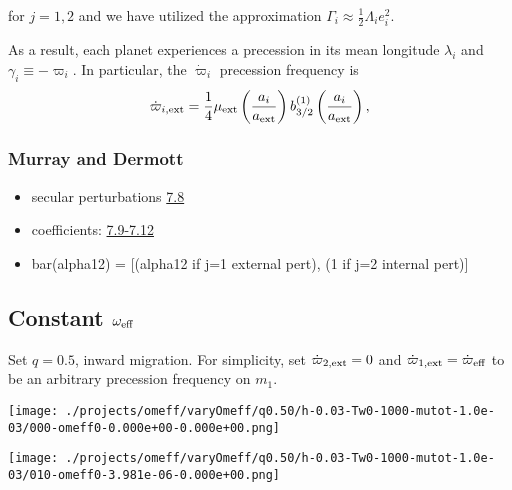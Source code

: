 \documentclass[11pt]{article}
\begin{document}
\noindent
for \(j=1,2\) and we have utilized the approximation \(\Gamma_i \approx \frac12 \Lambda_i e_i^2\).

As a result, each planet experiences a precession in its mean longitude \(\lambda_i\) and
\(\gamma_i\equiv -\varpi_i\). In particular, the \(\dot\varpi_i\) precession frequency
is
\begin{equation}
\dot\varpi_{i, \rm ext} = \frac14 \mu_{\rm ext} 
    \left(\frac{a_i}{a_{\rm ext}}\right) b_{3/2}^{(1)}\left(\frac{a_i}{a_{\rm ext}}\right),
\end{equation}

\subsubsection{Murray and Dermott}
\label{sec:org026bc7a}
\begin{itemize}
\item secular perturbations \href{./images/screenshot-02.png}{7.8}
\item coefficients: \href{./images/screenshot-03.png}{7.9-7.12}
\item bar(alpha12) = [(alpha12 if j=1 external pert),  (1 if j=2 internal pert)]
\end{itemize}

\subsection{Constant \(\omega_{\rm eff}\)}
\label{sec:orgff130bb}
Set \(q=0.5\), inward migration. For simplicity, set \(\dot\varpi_{2,\rm
ext} = 0\) and \(\dot\varpi_{1,\rm ext}=\dot\varpi_{\rm eff}\) to be an
arbitrary precession frequency on \(m_1\).

\begin{center}
\texttt{[image: ./projects/omeff/varyOmeff/q0.50/h-0.03-Tw0-1000-mutot-1.0e-03/000-omeff0-0.000e+00-0.000e+00.png]}
\end{center}

\begin{center}
\texttt{[image: ./projects/omeff/varyOmeff/q0.50/h-0.03-Tw0-1000-mutot-1.0e-03/010-omeff0-3.981e-06-0.000e+00.png]}
\end{center}
\end{document}
